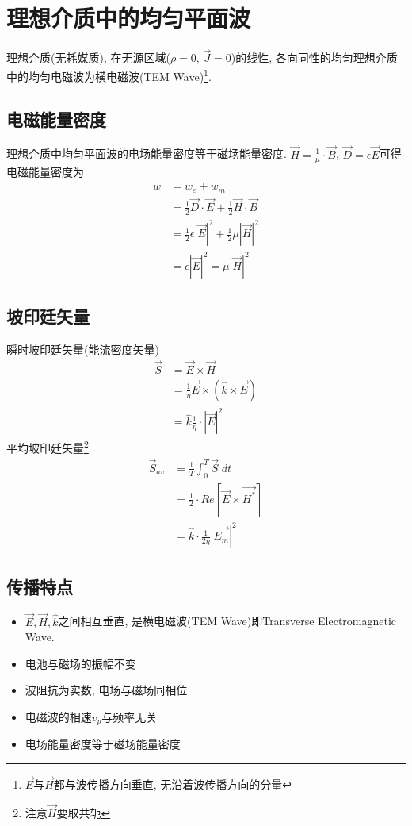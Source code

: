 \documentclass[a4paper]{report}
\begin{document}
\section{理想介质中的均匀平面波}
理想介质(无耗媒质), 在无源区域($\rho=0,\,\vec{J}=0$)的线性, 各向同性的均匀理想介质中的均匀电磁波为横电磁波(TEM Wave)\footnote{$\vec{E} $与$\vec{H} $都与波传播方向垂直, 无沿着波传播方向的分量}. 
\subsection{电磁能量密度}
理想介质中均匀平面波的电场能量密度等于磁场能量密度. $\vec{H}=\frac{1}{\mu}\cdot \vec{B}  $, $\vec{D}=\epsilon \vec{E}  $可得电磁能量密度为
\begin{align*}
    w&=w_e+w_m\\
    &=\frac{1}{2} \vec{D}\cdot\vec{E}+  \frac{1}{2} \vec{H}\cdot\vec{B}\\
    &=\frac{1}{2}\epsilon |\vec{E}|^2+\frac{1}{2}\mu |\vec{H}|^2\\
    &=\epsilon |\vec{E}|^2=\mu |\vec{H}|^2
\end{align*}
\subsection{坡印廷矢量}
瞬时坡印廷矢量(能流密度矢量)
\begin{align*}
    \vec{S}&=\vec{E}\times \vec{H}\\
    &=\frac{1}{\eta}\vec{E}\times(\hat{k}\times \vec{E} )\\
    &=\hat{k}\frac{1}{\eta}\cdot |\vec{E} |^2
\end{align*}
平均坡印廷矢量\footnote{注意$\vec{H}$要取共轭}
\begin{align*}
    \vec{S}_{av}&=\frac{1}{T}\int_0^T \vec{S} \;dt\\
    &=\frac{1}{2}\cdot Re[\vec{E}\times \vec{H^*}  ]\\
    &=\hat{k}\cdot \frac{1}{2\eta}|\vec{E_m}|^2
\end{align*}
\subsection{传播特点}
\begin{itemize}
    \item $\vec{E}, \vec{H}, \hat{k}  $之间相互垂直, 是横电磁波(TEM Wave)即Transverse Electromagnetic Wave. 
    \item 电池与磁场的振幅不变
    \item 波阻抗为实数, 电场与磁场同相位
    \item 电磁波的相速$v_p$与频率无关
    \item 电场能量密度等于磁场能量密度
\end{itemize}
\end{document}
